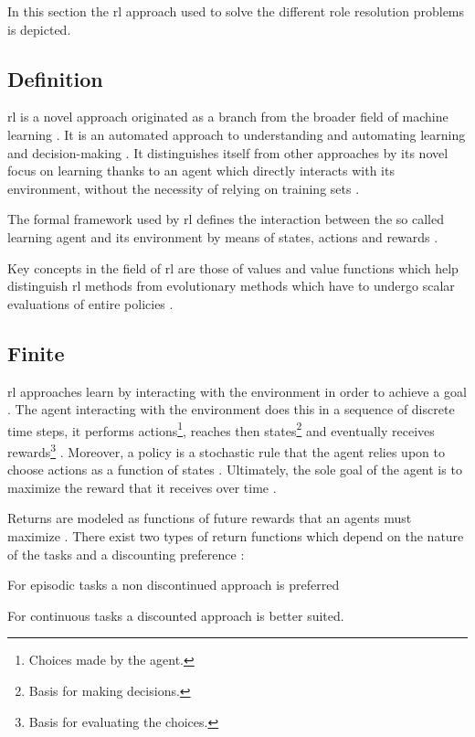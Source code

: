 In this section the \gls{rl} approach used to solve the different role resolution problems is depicted.

\subsection{ Definition}
\label{subsec:rl_definitions}

\gls{rl} is a novel approach originated as a branch from the broader field of machine learning \citep{Sutton2017}. It is an automated approach to understanding and automating learning and decision-making \citep[p. 15]{Sutton2017}. It distinguishes itself from other approaches by its novel focus on learning thanks to an agent which directly interacts with its environment, without the necessity of relying on training sets \citep[p. 15]{Sutton2017}.

The formal framework used by \gls{rl} defines the interaction between the so called learning agent and its environment by means of states, actions and rewards \citep[p. 15]{Sutton2017}.

Key concepts in the field of \gls{rl} are those of values and value functions which help distinguish \gls{rl} methods from evolutionary methods which have to undergo scalar evaluations of entire policies \citep[p. 15]{Sutton2017}.

\subsection{Finite }

\gls{rl} approaches learn by interacting with the environment in order to achieve a goal \citep{Sutton2017}. The agent interacting with the environment does this in a sequence of discrete time steps, it performs actions\footnote{Choices made by the agent.}, reaches then states\footnote{Basis for making decisions.} and eventually receives rewards\footnote{Basis for evaluating the choices.} \citep[p. 73]{Sutton2017}. Moreover, a policy is a stochastic rule that the agent relies upon to choose actions as a function of states \citep[p. 73]{Sutton2017}. Ultimately, the sole goal of the agent is to maximize the reward that it receives over time \citep[p. 73]{Sutton2017}.

Returns are modeled as functions of future rewards that an agents must maximize \citep[p. 73]{Sutton2017}. There exist two types of return functions which depend on the nature of the tasks and a discounting preference \citep[p. 73]{Sutton2017}:
\begin{enumerate*}
	\item For episodic tasks a non discontinued approach is preferred
	\item For continuous tasks a discounted approach is better suited.
\end{enumerate*}


